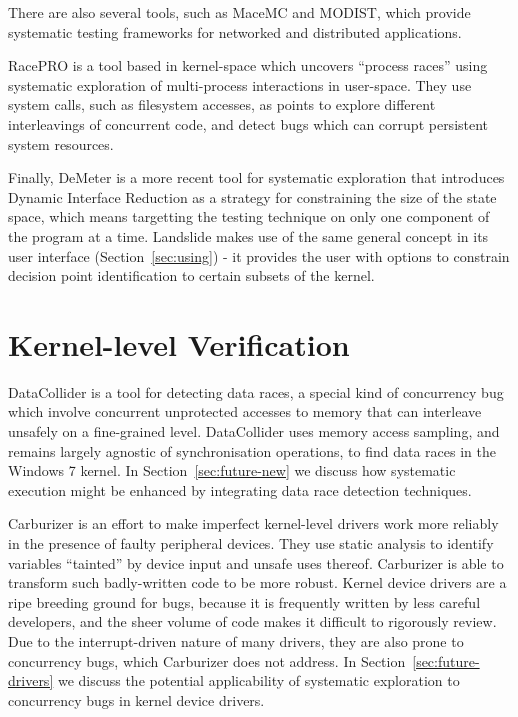 There are also several tools, such as MaceMC\cite{macemc} and MODIST\cite{modist}, which provide systematic testing frameworks for networked and distributed applications.

RacePRO\cite{racepro} is a tool based in kernel-space which uncovers ``process races'' using systematic exploration of multi-process interactions in user-space. They use system calls, such as filesystem accesses, as points to explore different interleavings of concurrent code, and detect bugs which can corrupt persistent system resources.

Finally, DeMeter\cite{demeter} is a more recent tool for systematic exploration that introduces Dynamic Interface Reduction as a strategy for constraining the size of the state space, which means targetting the testing technique on only one component of the program at a time. Landslide makes use of the same general concept in its user interface (Section~\ref{sec:using}) - it provides the user with options to constrain decision point identification to certain subsets of the kernel.

\section{Kernel-level Verification}

DataCollider\cite{datacollider} is a tool for detecting data races, a special kind of concurrency bug which involve concurrent unprotected accesses to memory that can interleave unsafely on a fine-grained level.
DataCollider uses memory access sampling, and remains largely agnostic of synchronisation operations, to find data races in the Windows 7 kernel.
In Section~\ref{sec:future-new} we discuss how systematic execution might be enhanced by integrating data race detection techniques.

Carburizer\cite{carburizer} is an effort to make imperfect kernel-level drivers work more reliably in the presence of faulty peripheral devices. They use static analysis to identify variables ``tainted'' by device input and unsafe uses thereof. Carburizer is able to transform such badly-written code to be more robust.
Kernel device drivers are a ripe breeding ground for bugs, because it is frequently written by less careful developers, and the sheer volume of code makes it difficult to rigorously review.
Due to the interrupt-driven nature of many drivers, they are also prone to concurrency bugs, which Carburizer does not address.
In Section~\ref{sec:future-drivers} we discuss the potential applicability of systematic exploration to concurrency bugs in kernel device drivers.

